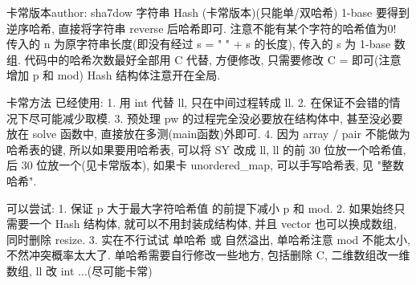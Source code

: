 卡常版本author: sha7dow
字符串 Hash (卡常版本)(只能单/双哈希)
1-base
要得到逆序哈希, 直接将字符串 reverse 后哈希即可.
注意不能有某个字符的哈希值为0!
传入的 n 为原字符串长度(即没有经过 s = " " + s 的长度), 传入的 s 为 1-base 数组.
代码中的哈希次数最好全部用 C 代替, 方便修改, 只需要修改 C = 即可(注意增加 p 和 mod)
Hash 结构体注意开在全局.


卡常方法
已经使用:
1. 用 int 代替 ll, 只在中间过程转成 ll.
2. 在保证不会错的情况下尽可能减少取模.
3. 预处理 pw 的过程完全没必要放在结构体中, 甚至没必要放在 solve 函数中, 直接放在多测(main函数)外即可.
4. 因为 array / pair 不能做为哈希表的键, 所以如果要用哈希表, 可以将 SY 改成 ll, ll 的前 30 位放一个哈希值, 
   后 30 位放一个(见卡常版本), 如果卡 unordered_map, 可以手写哈希表, 见 "整数哈希".

可以尝试:
1. 保证 p 大于最大字符哈希值 的前提下减小 p 和 mod.
2. 如果始终只需要一个 Hash 结构体, 就可以不用封装成结构体, 并且 vector 也可以换成数组, 同时删除 resize.
3. 实在不行试试 单哈希 或 自然溢出, 单哈希注意 mod 不能太小, 不然冲突概率太大了.
   单哈希需要自行修改一些地方, 包括删除 C, 二维数组改一维数组, ll 改 int ...(尽可能卡常) 